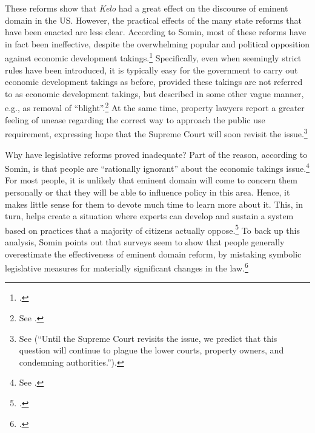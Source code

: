 
These reforms show that {\it Kelo} had a great effect on the discourse of eminent domain in the US. However, the practical effects of the many state reforms that have been enacted are less clear. According to Somin, most of these reforms have in fact been ineffective, despite the overwhelming popular and political opposition against economic development takings.\footcite[2170-2171]{somin09} Specifically, even when seemingly strict rules have been introduced, it is typically easy for the government to carry out economic development takings as before, provided these takings are not referred to as economic development takings, but described in some other vague manner, e.g., as removal of ``blight''.\footnote{See \cite[2170-2171]{somin09}.} At the same time, property lawyers report a greater feeling of unease regarding the correct way to approach the public use requirement, expressing hope that the Supreme Court will soon revisit the issue.\footnote{See \cite{murakami13} (``Until the Supreme Court revisits the issue, we predict that this question will continue to plague the lower courts, property owners, and condemning authorities.'').} 

Why have legislative reforms proved inadequate? Part of the reason, according to Somin, is that people are ``rationally ignorant'' about the economic takings issue.\footnote{See \cite[2170]{somin09}.} For most people, it is unlikely that eminent domain will come to concern them personally or that they will be able to influence policy in this area. Hence, it makes little sense for them to devote much time to learn more about it. This, in turn, helps create a situation where experts can develop and sustain a system based on practices that a majority of citizens actually oppose.\footcite[2163-2171]{somin09} To back up this analysis, Somin points out that surveys seem to show that people generally overestimate the effectiveness of eminent domain reform, by mistaking symbolic legislative measures for materially significant changes in the law.\footcite[2155-2157]{somin09}

